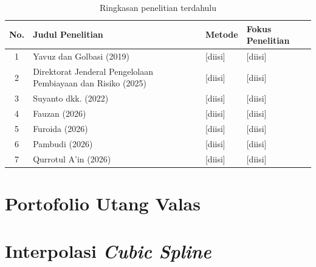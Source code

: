         \begin{table}[H]
            \centering
            \caption{Ringkasan penelitian terdahulu}\label{tab:past research}
            \small
            \begin{tabularx}{\linewidth}{|c|X|X|X|}
                \hline
                \textbf{No.} & \textbf{Judul Penelitian} & \textbf{Metode} & \textbf{Fokus Penelitian}\\
                \hline
                1 & Yavuz dan Golbasi (2019) & [diisi] & [diisi]\\
                \hline
                2 & Direktorat Jenderal Pengelolaan Pembiayaan dan Risiko (2025) & [diisi] & [diisi]\\
                \hline
                3 & Suyanto dkk. (2022) & [diisi] & [diisi]\\
                \hline
                4 & Fauzan (2026) & [diisi] & [diisi]\\
                \hline
                5 & Furoida (2026) & [diisi] & [diisi]\\
                \hline
                6 & Pambudi (2026) & [diisi] & [diisi]\\
                \hline
                7 & Qurrotul A'in (2026) & [diisi] & [diisi]\\
                \hline
            \end{tabularx}
        \end{table}

    \section{Portofolio Utang Valas}\label{sec:debt portfolio}

    \section{Interpolasi \textit{Cubic Spline}}\label{sec:spline}

